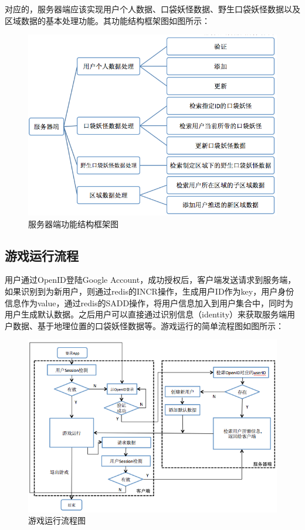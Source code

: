 \documentclass{article}
\begin{document}
\begin{CJK}{UTF8}{gbsn}
  对应的，服务器端应该实现用户个人数据、口袋妖怪数据、野生口袋妖怪数据以及区域数据的基本处理功能。其功能结构框架图如图所示：

  \begin{figure}[htbp]
		\centering
		\includegraphics[bb=0 0 693 500, scale=0.45]{figure/fig_n06.png}
		\caption{服务器端功能结构框架图}
		\label{fig:n06}
	\end{figure}

	\subsection{游戏运行流程}
  用户通过OpenID登陆Google Account，成功授权后，客户端发送请求到服务端，如果识别到为新用户，则通过redis的INCR\cite{N08}操作，生成用户ID作为key，用户身份信息作为value，通过redis的SADD操作，将用户信息加入到用户集合中，同时为用户生成默认数据。之后用户可以直接通过识别信息（identity）来获取服务端用户数据、基于地理位置的口袋妖怪数据等。游戏运行的简单流程图如图所示：

  \begin{figure}[htbp]
		\centering
		\includegraphics[bb=0 0 955 669, scale=0.45]{figure/fig_n07.png}
		\caption{游戏运行流程图}
		\label{fig:n07}
	\end{figure}


\end{CJK}
\end{document}
